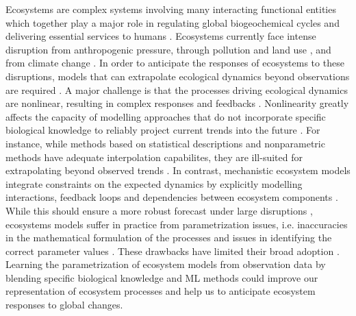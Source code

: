 Ecosystems are complex systems involving many interacting functional entities which together play a major role in regulating global biogeochemical cycles \cite{Bonan2008} and delivering essential services to humans \cite{Kremen2005}.
%
Ecosystems currently face intense disruption from anthropogenic pressure, through pollution and land use \cite{Doney2010,Ellis2011}, and from climate change \cite{Midgley2019}. In order to anticipate the responses of ecosystems to these disruptions, models that can extrapolate ecological dynamics beyond observations are required \cite{Boyd2012}. 
%
A major challenge is that the processes driving ecological dynamics are nonlinear, resulting in complex responses and feedbacks \cite{Scheffer2001}. Nonlinearity greatly affects the capacity of modelling approaches that do not incorporate specific biological knowledge to reliably project current trends into the future \cite{Barnosky2012}. For instance, while methods based on statistical descriptions \cite{Deneu2021} and nonparametric methods \cite{Ye2015,Ye2016,Deyle2016} have adequate interpolation capabilites, they are ill-suited for extrapolating beyond observed trends \cite{Barnosky2012,Urban2016}.
%
In contrast, mechanistic ecosystem models integrate constraints on the expected dynamics by explicitly modelling interactions, feedback loops and dependencies between ecosystem components \cite{Geary2020}. While this should ensure a more robust forecast under large disruptions \cite{Norberg2012}, ecosystems models suffer in practice from parametrization issues, i.e. inaccuracies in the mathematical formulation of the processes and issues in identifying the correct parameter values \cite{DeAngelis2015}. These drawbacks have limited their broad adoption \cite{Urban2016}.
%
Learning the parametrization of ecosystem models from observation data by blending specific biological knowledge and ML methods could improve our representation of ecosystem processes and help us to anticipate ecosystem responses to global changes.

